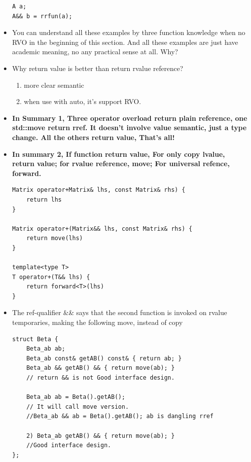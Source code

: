 \documentclass[a4paper,11pt,twoside]{book}
\begin{document}
\begin{itemize}
\begin{lstlisting}[numbers=none]
A a;
A&& b = rrfun(a);
\end{lstlisting}
	
	
	\item You can understand all these examples by three function knowledge when no RVO in the beginning of this section. And all these examples are just have academic meaning, no any practical sense at all. Why?

	
	\item Why return value is better than return rvalue reference?
	\begin{enumerate}
		\item more clear semantic 
		\item when use with auto, it's support RVO.
	\end{enumerate}


	
	\item \textbf{In Summary 1, Three operator overload return plain reference, one std::move return rref. It doesn't involve value semantic, just a type change. All the others return value, That's all!}
	
	\item \textbf{In summary 2, If function return value, For only copy lvalue, return value; for rvalue reference, move;  For universal refence, forward. }
	
\begin{lstlisting}[numbers=none]
Matrix operator+Matrix& lhs, const Matrix& rhs) {
	return lhs
}
	
Matrix operator+(Matrix&& lhs, const Matrix& rhs) {
	return move(lhs)
}
	
template<type T>
T operator+(T&& lhs) {
	return forward<T>(lhs)
}
\end{lstlisting}
	
	\item The ref-qualifier \&\& says that the second function is invoked on rvalue temporaries, making the following move, instead of copy
	
\begin{lstlisting}[numbers=none]
struct Beta {
	Beta_ab ab;
	Beta_ab const& getAB() const& { return ab; }
	Beta_ab && getAB() && { return move(ab); }
	// return && is not Good interface design.
	
	Beta_ab ab = Beta().getAB();
	// It will call move version.
	//Beta_ab && ab = Beta().getAB(); ab is dangling rref
	
	2) Beta_ab getAB() && { return move(ab); }
	//Good interface design.
};
\end{lstlisting}


\end{itemize}
\end{document}
